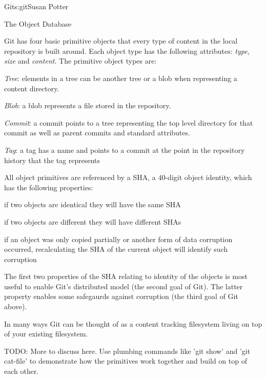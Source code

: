 \begin{aosachapter}{Git}{s:git}{Susan Potter}
\begin{aosasect1}{The Object Database}


Git has four basic primitive objects that every type of content in the
local repository is built around. Each object type has the following
attributes: \emph{type}, \emph{size} and \emph{content}. The primitive object
types are:
\begin{aosaitemize}
  \item \emph{Tree}: elements in a tree can be another tree or a blob when
  representing a content directory.
  \item \emph{Blob}: a blob represents a file stored in the repository.
  \item \emph{Commit}: a commit points to a tree representing the top level
  directory for that commit as well as parent commits and standard
  attributes.
  \item \emph{Tag}: a tag has a name and points to a commit at the point in
  the repository history that the tag represents
\end{aosaitemize}

All object primitives are referenced by a SHA, a 40-digit object identity,
which has the following properties:
\begin{aosaitemize}
  \item if two objects are identical they will have the same SHA
  \item if two objects are different they will have different SHAs
  \item if an object was only copied partially or another form of data
        corruption occurred, recalculating the SHA of the current object
        will identify such corruption
\end{aosaitemize}

The first two properties of the SHA relating to identity of the objects is
most useful to enable Git's distributed model (the second goal of Git).
The latter property enables some safegaurds against corruption (the third
goal of Git above).

In many ways Git can be thought of as a content tracking filesystem living on
top of your existing filesystem.

TODO: More to discuss here. Use plumbing commands like 'git show' and 'git
cat-file' to demonstrate how the primitives work together and build on top of
each other.

\end{aosasect1}


\end{aosachapter}
